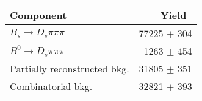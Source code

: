  \begin{tabular}{l r }
\hline\hline
Component & Yield\ \\
\hline
$B_s \to D_s \pi \pi \pi$ & 77225 $\pm$ 304 \\
$B^{0} \to D_s \pi \pi \pi$ & 1263 $\pm$ 454 \\
Partially reconstructed bkg. & 31805 $\pm$ 351 \\
Combinatorial bkg. & 32821 $\pm$ 393 \\
\hline\hline
\end{tabular}
\label{table:normYields}
